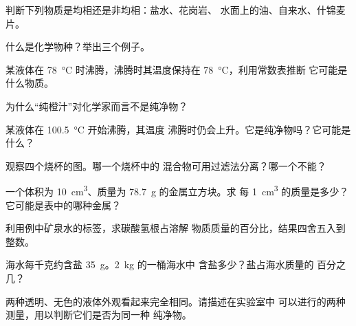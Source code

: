 \begin{exercise}[$\star$]\label{exo:g6:pure-substances-and-mixtures:2}
判断下列物质是均相还是非均相：盐水、花岗岩、
水面上的油、自来水、什锦麦片。
\end{exercise}

\begin{exercise}[$\star$]\label{exo:g6:pure-substances-and-mixtures:3}
什么是化学物种？举出三个例子。
\end{exercise}

\begin{exercise}[$\star$]\label{exo:g6:pure-substances-and-mixtures:4}
某液体在 \qty{78}{\celsius} 时沸腾，沸腾时其温度保持在
\qty{78}{\celsius}，利用常数表推断
它可能是什么物质。
\end{exercise}

\begin{exercise}[$\star$]\label{exo:g6:pure-substances-and-mixtures:5}
为什么“纯橙汁”对化学家而言不是纯净物？
\end{exercise}

\begin{exercise}[$\star\star$]\label{exo:g6:pure-substances-and-mixtures:6}
某液体在 \qty{100.5}{\celsius} 开始沸腾，其温度
沸腾时仍会上升。它是纯净物吗？它可能是什么？
\end{exercise}

\begin{exercise}[$\star\star$]\label{exo:g6:pure-substances-and-mixtures:7}
观察四个烧杯的图。哪一个烧杯中的
混合物可用过滤法分离？哪一个不能？
\end{exercise}

\begin{exercise}[$\star\star$]\label{exo:g6:pure-substances-and-mixtures:8}
一个体积为 \qty{10}{cm^3}、质量为 \qty{78.7}{g} 的金属立方块。求
每 \qty{1}{cm^3} 的质量是多少？它可能是表中的哪种金属？
\end{exercise}

\begin{exercise}[$\star\star$]\label{exo:g6:pure-substances-and-mixtures:9}
利用例中矿泉水的标签，求碳酸氢根占溶解
物质质量的百分比，结果四舍五入到整数。
\end{exercise}

\begin{exercise}[$\star\star$]\label{exo:g6:pure-substances-and-mixtures:10}
海水每千克约含盐 \qty{35}{g}。\qty{2}{kg} 的一桶海水中
含盐多少？盐占海水质量的
百分之几？
\end{exercise}

\begin{exercise}[$\star\star\star$]\label{exo:g6:pure-substances-and-mixtures:11}
两种透明、无色的液体外观看起来完全相同。请描述在实验室中
可以进行的两种测量，用以判断它们是否为同一种
纯净物。
\end{exercise}

